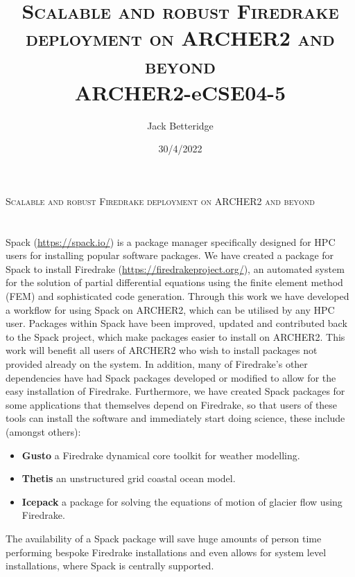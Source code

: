 \documentclass[a4paper,11pt]{article}
\title{\textsc{Scalable and robust Firedrake deployment on ARCHER2 and beyond}\\
\Large ARCHER2-eCSE04-5}
\author{Jack Betteridge}
\date{30/4/2022}
\begin{document}


\begin{center}\huge\textsc{Scalable and robust Firedrake deployment on ARCHER2 and beyond}\end{center}
\section*{}
\label{sec:intro}
Spack (\url{https://spack.io/}) is a package manager specifically designed for HPC users for installing popular software packages.
We have created a package for Spack to install Firedrake (\url{https://firedrakeproject.org/}), an automated system for the solution of partial differential equations using the finite element method (FEM) and sophisticated code generation.
Through this work we have developed a workflow for using Spack on ARCHER2, which can be utilised by any HPC user.
Packages within Spack have been improved, updated and contributed back to the Spack project, which make packages easier to install on ARCHER2.
This work will benefit all users of ARCHER2 who wish to install packages not provided already on the system.
In addition, many of Firedrake's other dependencies have had Spack packages developed or modified to allow for the easy installation of Firedrake.
Furthermore, we have created Spack packages for some applications that themselves depend on Firedrake, so that users of these tools can install the software and immediately start doing science, these include (amongst others):
\begin{itemize}[topsep=2pt, partopsep=0pt, itemsep=1pt, parsep=1pt]
	\item \textbf{Gusto} a Firedrake dynamical core toolkit for weather modelling.
	\item \textbf{Thetis} an unstructured grid coastal ocean model.
	\item \textbf{Icepack} a package for solving the equations of motion of glacier flow using Firedrake.
\end{itemize}
The availability of a Spack package will save huge amounts of person time performing bespoke Firedrake installations and even allows for system level installations, where Spack is centrally supported.
\end{document}

